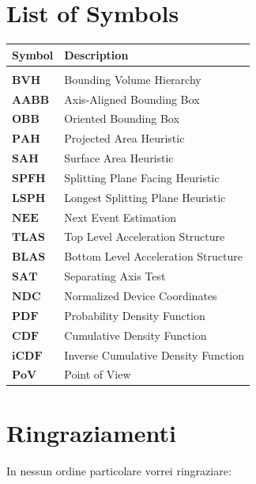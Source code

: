\documentclass{PoliMi_MasterThesis}
\begin{document}
\chapter*{List of Symbols}
\begin{table}[H]
    \centering
    \begin{tabular}{ll}
        \textbf{Symbol} & \textbf{Description}\\\hline\\[-9px]
        $\bm{BVH}$ & Bounding Volume Hierarchy\\[2px]
        $\bm{AABB}$ & Axis-Aligned Bounding Box\\[2px]
        $\bm{OBB}$ & Oriented Bounding Box\\[2px]
        $\bm{PAH}$ & Projected Area Heuristic\\[2px]
        $\bm{SAH}$ & Surface Area Heuristic\\[2px]
        $\bm{SPFH}$ & Splitting Plane Facing Heuristic\\[2px]
        $\bm{LSPH}$ & Longest Splitting Plane Heuristic\\[2px]
        $\bm{NEE}$ & Next Event Estimation\\[2px]
        $\bm{TLAS}$ & Top Level Acceleration Structure\\[2px]
        $\bm{BLAS}$ & Bottom Level Acceleration Structure\\[2px]
        $\bm{SAT}$ & Separating Axis Test\\[2px]
        $\bm{NDC}$ & Normalized Device Coordinates\\[2px]
        $\bm{PDF}$ & Probability Density Function\\[2px]
        $\bm{CDF}$ & Cumulative Density Function\\[2px]
        $\bm{iCDF}$ & Inverse Cumulative Density Function\\[2px]
        $\bm{PoV}$ & Point of View\\[2px]
    \end{tabular}
\end{table}


\chapter*{Ringraziamenti}
\small
In nessun ordine particolare vorrei ringraziare:
\end{document}
